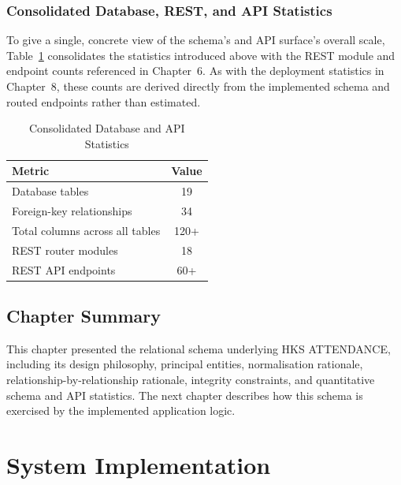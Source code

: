 \documentclass[12pt, a4paper, oneside]{report}
\begin{document}
\subsection{Consolidated Database, REST, and API Statistics}
\label{sec:db-rest-stats}

To give a single, concrete view of the schema's and API surface's overall scale, Table~\ref{tab:db-rest-stats} consolidates the statistics introduced above with the REST module and endpoint counts referenced in Chapter~6. As with the deployment statistics in Chapter~8, these counts are derived directly from the implemented schema and routed endpoints rather than estimated.

\begin{table}[htbp]
\centering
\caption{Consolidated Database and API Statistics}
\label{tab:db-rest-stats}
\begin{tabularx}{\textwidth}{|X|c|}
\hline
\textbf{Metric} & \textbf{Value} \\
\hline
Database tables & 19 \\
\hline
Foreign-key relationships & 34 \\
\hline
Total columns across all tables & 120+ \\
\hline
REST router modules & 18 \\
\hline
REST API endpoints & 60+ \\
\hline
\end{tabularx}
\end{table}

\section{Chapter Summary}

This chapter presented the relational schema underlying HKS ATTENDANCE, including its design philosophy, principal entities, normalisation rationale, relationship-by-relationship rationale, integrity constraints, and quantitative schema and API statistics. The next chapter describes how this schema is exercised by the implemented application logic.

\chapter{System Implementation}
\label{chap:implementation}
\end{document}
